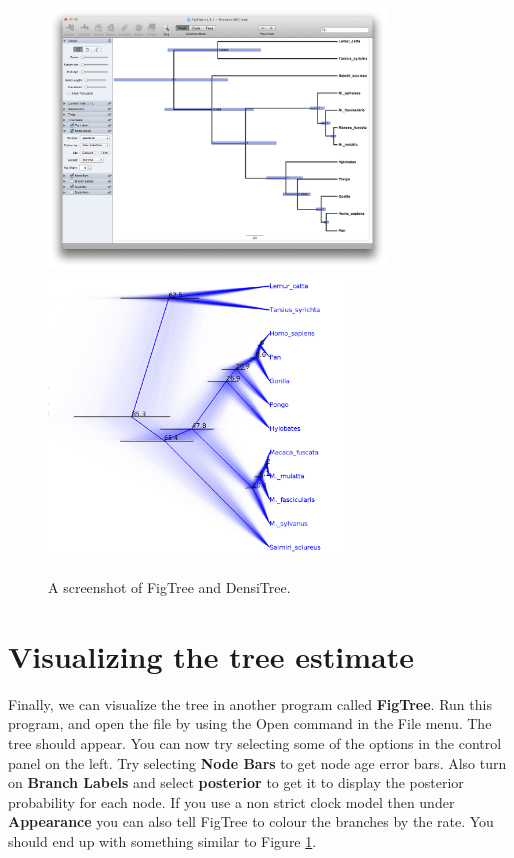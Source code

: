 \documentclass[11pt]{article}
\theoremstyle{plain}%
\theoremstyle{definition}
\theoremstyle{remark}
\begin{document}
\begin{figure}
\includegraphics[width=0.8\textwidth]{figures/FigTree}
\includegraphics[width=0.7\textwidth]{figures/DensiTree}
\caption{A screenshot of FigTree and DensiTree.}
\label{fig:FigTree}
\end{figure}
\section{Visualizing the tree estimate}
Finally, we can visualize the tree in another program called {\bf FigTree}. Run this program, and open
the \mccTree{} file by using the Open command in the File menu. The tree should appear.
You can now try selecting some of the options in the control panel on the left. Try selecting
{\bf Node Bars} to get node age error bars. Also turn on {\bf Branch Labels} and select {\bf posterior} to get
it to display the posterior probability for each node. 
If you use a non strict clock model then under {\bf Appearance} you can also tell FigTree to colour the branches by the rate.
You should end up with something similar to Figure \ref{fig:FigTree}.
\end{document}
